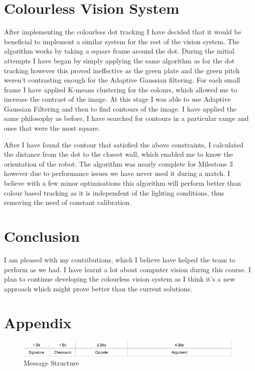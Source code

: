 \documentclass[a4paper,12pt]{article}
\begin{document}
\section{Colourless Vision System}

After implementing the colourless dot tracking I have decided that it would be beneficial to implement a similar system for the rest of the vision system. The algorithm works by taking a square frame around the dot. During the initial attempts I have began by simply applying the same algorithm as for the dot tracking however this proved ineffective as the green plate and the green pitch weren't contrasting enough for the Adaptive Gaussian filtering. For each small frame I have applied K-means clustering for the colours, which allowed me to increase the contrast of the image. At this stage I was able to use Adaptive Gaussian Filtering and then to find contours of the image. I have applied the same philosophy as before, I have searched for contours in a particular range and ones that were the most square. 

After I have found the contour that satisfied the above constraints, I calculated the distance from the dot to the closest wall, which enabled me to know the orientation of the robot. The algorithm was nearly complete for Milestone 3 however due to performance issues we have never used it during a match. I believe with a few minor optimisations this algorithm will perform better than colour based tracking as it is independent of the lighting conditions, thus removing the need of constant calibration.


\section{Conclusion}

I am pleased with my contributions, which I believe have helped the team to perform as we had. I have learnt a lot about computer vision during this course. I plan to continue developing the colourless vision system as I think it's a new approach which might prove better than the current solutions. 

\newpage
\section{Appendix}

\begin{figure}[ht!]
\centering
\includegraphics[width=130mm]{comms.png}
\caption{Message Structure}
\label{fig:comms}
\end{figure}
\end{document}
